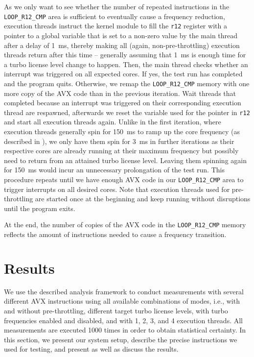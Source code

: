 As we only want to see whether the number of repeated instructions in the \texttt{LOOP\_R12\_CMP} area is sufficient to eventually cause a frequency reduction, execution threads instruct the kernel module to fill the \texttt{r12} register with a pointer to a global variable that is set to a non-zero value by the main thread after a delay of \SI{1}{\milli\second}, thereby making all (again, non-pre-throttling) execution threads return after this time -- generally assuming that \SI{1}{\milli\second} is enough time for a turbo license level change to happen. Then, the main thread checks whether an interrupt was triggered on all expected cores. If yes, the test run has completed and the program quits. Otherwise, we remap the \texttt{LOOP\_R12\_CMP} memory with one more copy of the \gls{AVX} code than in the previous iteration. Wait threads that completed because an interrupt was triggered on their corresponding execution thread are respawned, afterwards we reset the variable used for the pointer in \texttt{r12} and start all execution threads again. Unlike in the first iteration, where execution threads generally spin for \SI{150}{\milli\second} to ramp up the core frequency (as described in ), we only have them spin for \SI{3}{\milli\second} in further iterations as their respective cores are already running at their maximum frequency but possibly need to return from an attained turbo license level. Leaving them spinning again for \SI{150}{\milli\second} would incur an unnecessary prolongation of the test run. This procedure repeats until we have enough \gls{AVX} code in our \texttt{LOOP\_R12\_CMP} area to trigger interrupts on all desired cores. Note that execution threads used for pre-throttling are started once at the beginning and keep running without disruptions until the program exits.

At the end, the number of copies of the \gls{AVX} code in the \texttt{LOOP\_R12\_CMP} memory reflects the amount of instructions needed to cause a frequency transition.

\section{Results}
\label{sec:analysis:results}

We use the described analysis framework to conduct measurements with several different \gls{AVX} instructions using all available combinations of modes, i.e., with and without pre-throttling, different target turbo license levels, with turbo frequencies enabled and disabled, and with 1, 2, 3, and 4 execution threads. All measurements are executed 1000 times in order to obtain statistical certainty. In this section, we present our system setup, describe the precise instructions we used for testing, and present as well as discuss the results.

